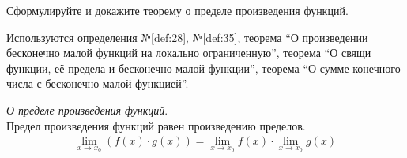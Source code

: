 \begin{question}
    Сформулируйте и докажите теорему о пределе произведения функций.
\end{question}
\begin{used}
    Используются определения №\ref{def:28}, №\ref{def:35}, теорема ``О произведении бесконечно малой функций на локально ограниченную'', теорема ``О свящи функции, её предела и бесконечно малой функции'', теорема ``О сумме конечного числа с бесконечно малой функцией''.
\end{used}
\begin{theorem}
    \textit{О пределе произведения функций}. \\
    Предел произведения функций равен произведению пределов.
    \begin{gather*}
        \lim_{x \to x_0} (f(x) \cdot g(x)) = \lim_{x \to x_0} f(x) \cdot \lim_{x \to x_0} g(x)
    \end{gather*}
\end{theorem}
